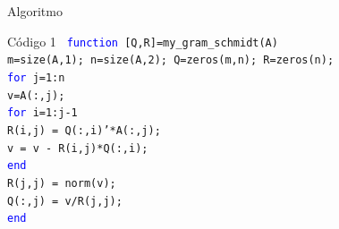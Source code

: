\documentclass{beamer}
\begin{document}
 \begin{frame}{Algoritmo}
 \begin{block}{C\'odigo 1}
 \texttt{
 \hspace{-0.25cm}\textcolor{blue}{function} [Q,R]=my\_gram\_schmidt(A)\\
 m=size(A,1); n=size(A,2); Q=zeros(m,n); R=zeros(n);\\
 \textcolor{blue}{for} j=1:n\\
 \hspace{0.25cm} v=A(:,j);\\
 \hspace{0.25cm} \textcolor{blue}{for} i=1:j-1\\
 \hspace{0.5cm} R(i,j) = Q(:,i)'*A(:,j);\\
 \hspace{0.5cm} v = v - R(i,j)*Q(:,i);\\
 \hspace{0.25cm} \textcolor{blue}{end}\\
 \hspace{0.25cm} R(j,j) = norm(v);\\
 \hspace{0.25cm} Q(:,j) = v/R(j,j);\\
 \textcolor{blue}{end}
 }
 \end{block}
 \end{frame}
\end{document}
